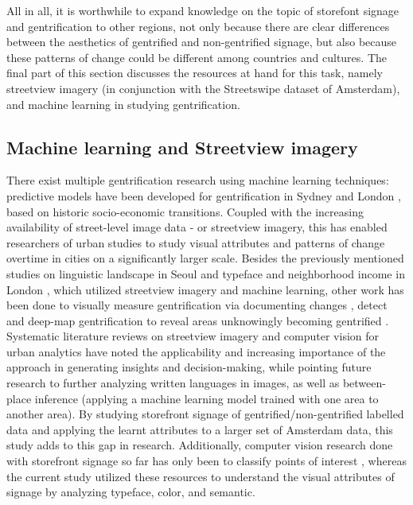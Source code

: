 All in all, it is worthwhile to expand knowledge on the topic of storefont signage and gentrification to other regions, not only because there are clear differences between the aesthetics of gentrified and non-gentrified signage, but also because these patterns of change could be different among countries and cultures. The final part of this section discusses the resources at hand for this task, namely streetview imagery (in conjunction with the Streetswipe dataset of Amsterdam), and machine learning in studying gentrification.

\subsection{Machine learning and Streetview imagery}

There exist multiple gentrification research using machine learning techniques: predictive models have been developed for gentrification in Sydney \cite{thackway2021} and London \cite{reades2019}, based on historic socio-economic transitions. Coupled with the increasing availability of street-level image data - or streetview imagery, this has enabled researchers of urban studies to study visual attributes and patterns of change overtime in cities on a significantly larger scale. Besides the previously mentioned studies on linguistic landscape in Seoul \cite{hong2020} and typeface and neighborhood income in London \cite{ma2019}, which utilized streetview imagery and machine learning, other work has been done to visually measure gentrification via documenting changes \cite{ravuri2022}, detect \cite{huang2022} and deep-map gentrification to reveal areas unknowingly becoming gentrified \cite{ilic2019}. Systematic literature reviews on streetview imagery and computer vision for urban analytics \cite{biljecki_2021, zhanga2023} have noted the applicability and increasing importance of the approach in generating insights and decision-making, while pointing future research to further analyzing written languages in images, as well as between-place inference (applying a machine learning model trained with one area to another area). By studying storefront signage of gentrified/non-gentrified labelled data and applying the learnt attributes to a larger set of Amsterdam data, this study adds to this gap in research. Additionally, computer vision research done with storefront signage so far has only been to classify points of interest \cite{noorian2020, bakaev2019}, whereas the current study utilized these resources to understand the visual attributes of signage by analyzing typeface, color, and semantic.

